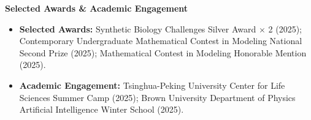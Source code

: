\documentclass[10pt]{article}
\begin{document}
	\vspace{2pt}
	\begin{center}
		\textbf{\large Selected Awards \& Academic Engagement}
	\end{center}
	\vspace{-4pt}
	\begin{itemize}[noitemsep, topsep=2pt, partopsep=0pt, parsep=0pt, leftmargin=*]
		\item \textbf{Selected Awards:} Synthetic Biology Challenges Silver Award $\times$ 2 (2025); Contemporary Undergraduate Mathematical Contest in Modeling National Second Prize (2025); Mathematical Contest in Modeling Honorable Mention (2025).
		\item \textbf{Academic Engagement:} Tsinghua-Peking University Center for Life Sciences Summer Camp (2025); Brown University Department of Physics Artificial Intelligence Winter School (2025).
	\end{itemize}
	
\end{document}
